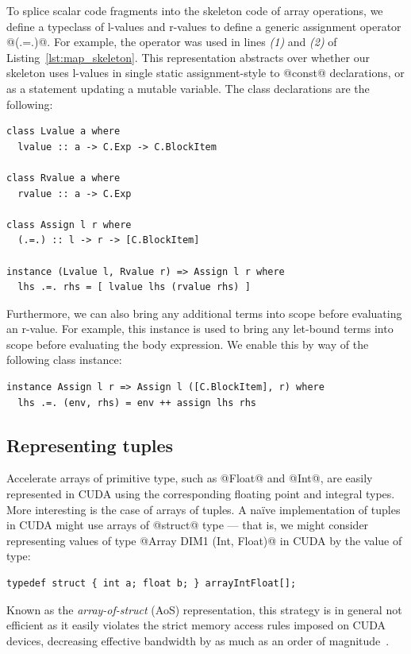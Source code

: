 To splice scalar code fragments into the skeleton code of array operations, we
define a typeclass of l-values and r-values to define a generic assignment
operator @(.=.)@. For example, the operator was used in lines \emph{(1)}
and \emph{(2)} of Listing~\ref{lst:map_skeleton}. This representation abstracts
over whether our skeleton uses l-values in single static assignment-style to
@const@ declarations, or as a statement updating a mutable variable. The
class declarations are the following:
%
\begin{lstlisting}[style=haskell]
class Lvalue a where
  lvalue :: a -> C.Exp -> C.BlockItem

class Rvalue a where
  rvalue :: a -> C.Exp

class Assign l r where
  (.=.) :: l -> r -> [C.BlockItem]

instance (Lvalue l, Rvalue r) => Assign l r where
  lhs .=. rhs = [ lvalue lhs (rvalue rhs) ]
\end{lstlisting}

Furthermore, we can also bring any additional terms into scope before evaluating
an r-value. For example, this instance is used to bring any let-bound terms into
scope before evaluating the body expression. We enable this by way of the
following class instance:
%
\begin{lstlisting}[style=haskell]
instance Assign l r => Assign l ([C.BlockItem], r) where
  lhs .=. (env, rhs) = env ++ assign lhs rhs
\end{lstlisting}


\subsection{Representing tuples}
\label{sec:representing_tuples}

Accelerate arrays of primitive type, such as @Float@ and @Int@, are
easily represented in CUDA using the corresponding floating point and integral
types. More interesting is the case of arrays of tuples. A na\"ive
implementation of tuples in CUDA might use arrays of @struct@ type --- that
is, we might consider representing values of type @Array DIM1 (Int, Float)@
in CUDA by the value of type:
%
\begin{lstlisting}[style=cuda]
typedef struct { int a; float b; } arrayIntFloat[];
\end{lstlisting}
%
Known as the \emph{array-of-struct} (AoS)
representation, this strategy is in general not efficient as it easily violates
the strict memory access rules imposed on CUDA devices, decreasing effective
bandwidth by as much as an order of magnitude~\cite{NVIDIA:2012wf}.

